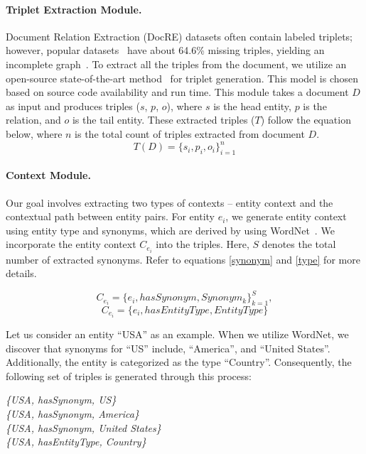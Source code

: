 \documentclass[letterpaper]{article} %
\begin{document}
\paragraph{
\textbf{Triplet Extraction Module.}} Document Relation Extraction (DocRE) datasets often contain labeled triplets; however, popular datasets~\cite{yao-etal-2019-docred} have about 64.6\% missing triples, yielding an incomplete graph~\cite{DBLP:conf/emnlp/Tan0BNA22}. To extract all the triples from the  document, we utilize an open-source state-of-the-art method~\cite{huguet-cabot-navigli-2021-rebel-relation} for triplet generation. This model is chosen based on source code availability and run time. This module takes a document $D$ as input and produces triples ($s$, $p$, $o$), where $s$ is the head entity, $p$ is the relation, and $o$ is the tail entity. These extracted triples ($T$) follow the equation below, where $n$ is the total count of triples extracted from document $D$.
\begin{equation}\label{eq3}
    T(D)=\{s_i,p_i,o_i\}_{i=1}^n
\end{equation}

\paragraph{\textbf{Context Module.}} Our goal involves extracting two types of contexts -- entity context and the contextual path between entity pairs. For entity $e_i$, we generate entity context using entity type and synonyms, which are derived by using WordNet~\cite{10.1145/219717.219748}.
We incorporate the entity context $C_{e_i}$ into the triples. Here, $S$ denotes the total number of extracted synonyms. Refer to equations \ref{synonym} and \ref{type} for more details.

 \begin{equation}\label{synonym}
C_{e_i}=\{e_i, hasSynonym, Synonym_k\}_{k=1}^S,
\end{equation}
\begin{equation}\label{type}
C_{e_i}=\{ e_i, hasEntityType,{EntityType}\}
\end{equation}






Let us consider an entity \enquote{USA} as an example. When we utilize WordNet, we discover that synonyms for \enquote{US} include, \enquote{America}, and \enquote{United States}. Additionally, the entity is categorized as the type \enquote{Country}. Consequently, the following set of triples is generated through this process:
\begin{tcolorbox}
\centering
\small
\textit{\{{USA, hasSynonym, US}\} }\\
\textit{\{{USA, hasSynonym, America}\} }\\
\textit{\{{USA, hasSynonym, United States}\}} \\
 \textit{\{{USA, hasEntityType, Country}\}} \\
\end{tcolorbox}
\end{document}
